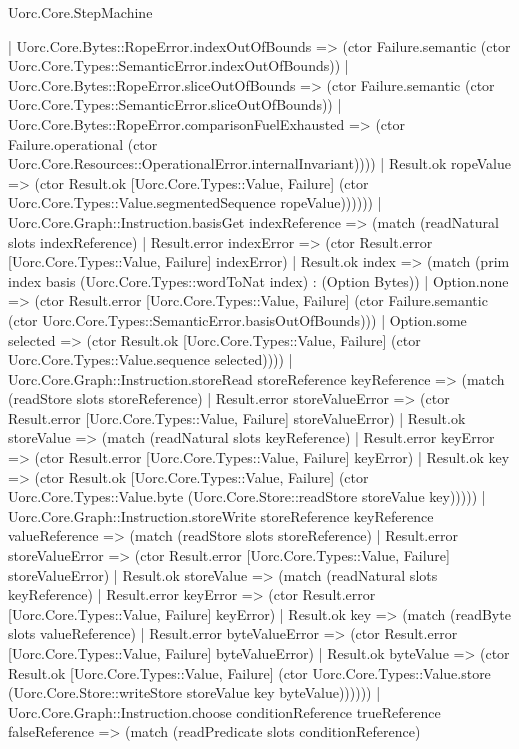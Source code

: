 \begin{lexlean}{Uorc.Core.StepMachine}
\begin{semanticmodule}
{              | Uorc.Core.Bytes::RopeError.indexOutOfBounds => (ctor Failure.semantic (ctor Uorc.Core.Types::SemanticError.indexOutOfBounds))
              | Uorc.Core.Bytes::RopeError.sliceOutOfBounds => (ctor Failure.semantic (ctor Uorc.Core.Types::SemanticError.sliceOutOfBounds))
              | Uorc.Core.Bytes::RopeError.comparisonFuelExhausted => (ctor Failure.operational (ctor Uorc.Core.Resources::OperationalError.internalInvariant))))
            | Result.ok ropeValue => (ctor Result.ok [Uorc.Core.Types::Value, Failure] (ctor Uorc.Core.Types::Value.segmentedSequence ropeValue))))))
    | Uorc.Core.Graph::Instruction.basisGet indexReference => (match (readNatural slots indexReference)
      | Result.error indexError => (ctor Result.error [Uorc.Core.Types::Value, Failure] indexError)
      | Result.ok index => (match (prim index basis (Uorc.Core.Types::wordToNat index) : (Option Bytes))
        | Option.none => (ctor Result.error [Uorc.Core.Types::Value, Failure] (ctor Failure.semantic (ctor Uorc.Core.Types::SemanticError.basisOutOfBounds)))
        | Option.some selected => (ctor Result.ok [Uorc.Core.Types::Value, Failure] (ctor Uorc.Core.Types::Value.sequence selected))))
    | Uorc.Core.Graph::Instruction.storeRead storeReference keyReference => (match (readStore slots storeReference)
      | Result.error storeValueError => (ctor Result.error [Uorc.Core.Types::Value, Failure] storeValueError)
      | Result.ok storeValue => (match (readNatural slots keyReference)
        | Result.error keyError => (ctor Result.error [Uorc.Core.Types::Value, Failure] keyError)
        | Result.ok key => (ctor Result.ok [Uorc.Core.Types::Value, Failure] (ctor Uorc.Core.Types::Value.byte (Uorc.Core.Store::readStore storeValue key)))))
    | Uorc.Core.Graph::Instruction.storeWrite storeReference keyReference valueReference => (match (readStore slots storeReference)
      | Result.error storeValueError => (ctor Result.error [Uorc.Core.Types::Value, Failure] storeValueError)
      | Result.ok storeValue => (match (readNatural slots keyReference)
        | Result.error keyError => (ctor Result.error [Uorc.Core.Types::Value, Failure] keyError)
        | Result.ok key => (match (readByte slots valueReference)
          | Result.error byteValueError => (ctor Result.error [Uorc.Core.Types::Value, Failure] byteValueError)
          | Result.ok byteValue => (ctor Result.ok [Uorc.Core.Types::Value, Failure] (ctor Uorc.Core.Types::Value.store (Uorc.Core.Store::writeStore storeValue key byteValue))))))
    | Uorc.Core.Graph::Instruction.choose conditionReference trueReference falseReference => (match (readPredicate slots conditionReference)
}
\end{semanticmodule}
\end{lexlean}
